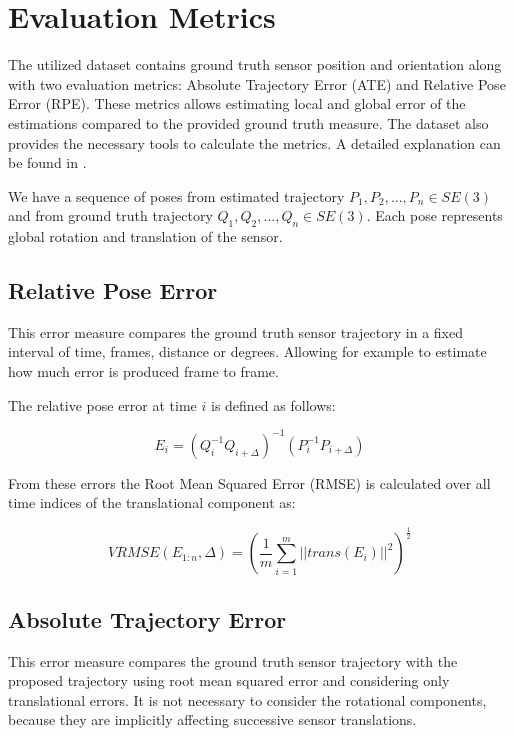 \section{Evaluation Metrics}

The utilized dataset contains ground truth sensor position and orientation along with two 
evaluation metrics: Absolute Trajectory Error (ATE) and Relative Pose Error (RPE). These metrics 
allows estimating local and global error of the estimations compared to the provided ground truth measure. The dataset
 also provides the necessary tools to calculate the metrics. A detailed explanation can be found in \cite{sturm12iros}.

We have a sequence of poses from estimated trajectory $P_1,P_2,...,P_n \in SE(3)$ and from ground truth trajectory 
$Q_1,Q_2,...,Q_n \in SE(3)$. Each pose represents global rotation and translation of the sensor.



\subsection{Relative Pose Error}

This error measure compares the ground truth sensor trajectory in a fixed interval of time, frames, distance or degrees. 
Allowing for example to estimate how much error is produced frame to frame.

The relative pose error at time $i$ is defined as follows:

\begin{equation}
E_i = ( Q_i^{-1} Q_{i+\Delta})^{-1}(P_i^{-1}P_{i+\Delta})
\end{equation}

From these errors the Root Mean Squared Error (RMSE) is calculated over all time indices of the translational component as:

\begin{equation}
VRMSE(E_{1:n},\Delta) = (\frac{1}{m} \sum_{i=1}^m ||trans(E_i)||^2 )^{\frac{1}{2}}
\end{equation}


\subsection{Absolute Trajectory Error}

This error measure compares the ground truth sensor trajectory with the proposed trajectory using root mean 
squared error and considering only translational errors. It is not necessary to consider the rotational components, 
because they are implicitly affecting successive sensor translations.

